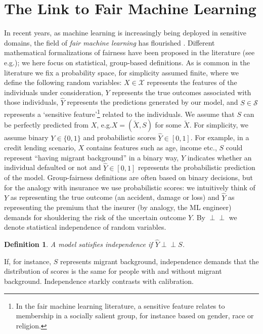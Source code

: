\documentclass[11pt]{article} %
\makeatletter
\newcommand*{\eg}{e.g.\@\xspace}
\newcommand{\indep}{\perp \!\!\! \perp}
\newtheorem{definition}[theorem]{Definition}
\makeatother
\begin{document}
\section{The Link to Fair Machine Learning}
\label{sec:fairmllink}
In recent years, as machine learning is increasingly being deployed in sensitive domains, the field of \textit{fair machine learning} has flourished \citep{barocas-hardt-narayanan,mitchell2021algorithmic,mehrabi2021survey,castelnovo2022clarification}. Different mathematical formalizations of fairness have been proposed in the literature (see \eg \citep{barocas-hardt-narayanan}); we here focus on statistical, group-based definitions. 
As is common in the literature we fix a probability space, for simplicity assumed finite, where we define the following random variables: $X \in \mathcal{X}$ represents the features of the individuals under consideration, $Y$ represents the true outcomes associated with those individuals, $\hat{Y}$ represents the predictions generated by our model, and $S \in \mathcal{S}$ represents a `sensitive feature'\footnote{In the fair machine learning literature, a sensitive feature relates to membership in a socially salient group, for instance based on gender, race or religion.} related to the individuals. We assume that $S$ can be perfectly predicted from $X$, \eg $X=(\tilde{X},S)$ for some $\tilde{X}$.
For simplicity, we assume binary $Y \in \{0,1\}$ and probabilistic scores $\hat{Y} \in [0,1]$. For example, in a credit lending scenario, $X$ contains features such as age, income etc., $S$ could represent ``having migrant background'' in a binary way,
$Y$ indicates whether an individual defaulted or not and $\hat{Y} \in [0,1]$ represents the probabilistic prediction of the model. Group-fairness definitions are often based on binary decisions, but for the analogy with insurance we use probabilistic scores: we intuitively think of $Y$ as representing the true outcome (an accident, damage or loss) and $\hat{Y}$ as representing the premium that the insurer (by analogy, the ML engineer) demands for shouldering the risk of the uncertain outcome $Y$. By $\indep$ we denote statistical independence of random variables. 

\begin{definition}
\label{def:independence}
    A model satisfies \emph{independence} if \thinspace\thinspace $\hat{Y} \indep S $.
\end{definition}
If, for instance, $S$ represents migrant background, independence demands that the distribution of scores is the same for people with and without migrant background. Independence starkly contrasts with calibration.
\end{document}
